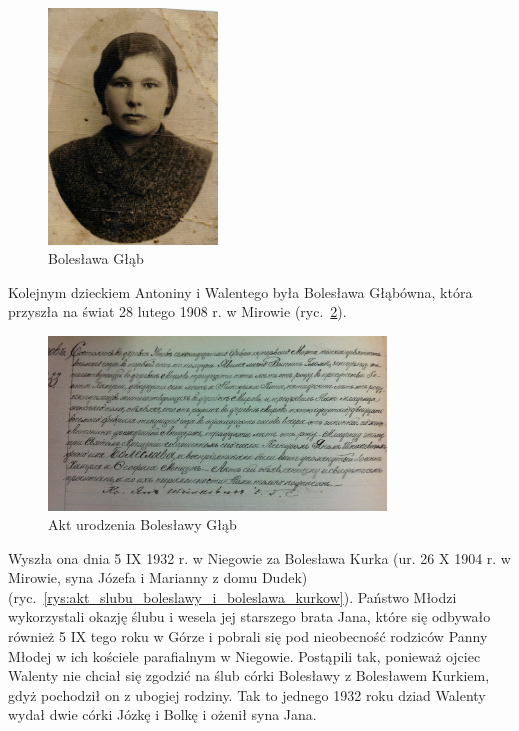 \begin{figure}[!h]
\begin{center}
\includegraphics[width=0.4\textwidth]{zdjecia/boleslawa_glab.jpg}
\caption{Bolesława Głąb}
\label{rys:boleslawa_glab}
\end{center}
\end{figure}

Kolejnym dzieckiem Antoniny i Walentego była Bolesława Głąbówna, która przyszła na świat 28 lutego 1908 r. w Mirowie (ryc.~\ref{rys:akt_urodzenia_boleslawy_glab}).

\begin{figure}[!h]
\begin{center}
\includegraphics[width=0.8\textwidth]{zdjecia/akt_urodzenia_boleslawy_glab.jpg}
\caption{Akt urodzenia Bolesławy Głąb}
\label{rys:akt_urodzenia_boleslawy_glab}
\end{center}
\end{figure}

Wyszła ona dnia 5 IX 1932 r. w Niegowie za Bolesława Kurka (ur. 26 X 1904 r. w Mirowie, syna Józefa i Marianny z domu Dudek) (ryc.~\ref{rys:akt_slubu_boleslawy_i_boleslawa_kurkow}). Państwo Młodzi wykorzystali okazję ślubu i wesela jej starszego brata Jana, które się odbywało również 5 IX tego roku w Górze i pobrali się pod nieobecność rodziców Panny Młodej w ich kościele parafialnym w Niegowie. Postąpili tak, ponieważ ojciec Walenty nie chciał się zgodzić na ślub córki Bolesławy z Bolesławem Kurkiem, gdyż pochodził on z ubogiej rodziny. Tak to jednego 1932 roku dziad Walenty wydał dwie córki Józkę i Bolkę i ożenił syna Jana.

